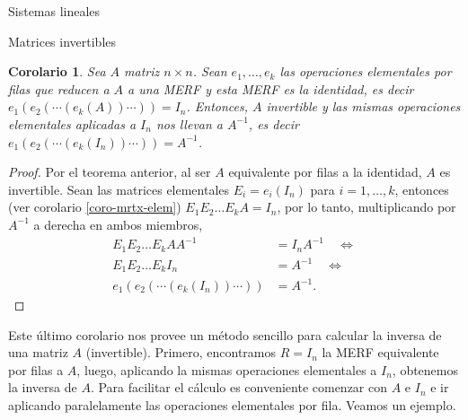 \documentclass[a4paper,12pt,twoside,spanish]{amsbook}
\newtheorem{corolario}[teorema]{Corolario}
\theoremstyle{definition}
\theoremstyle{remark}
\begin{document}
\begin{chapter}{Sistemas lineales}
\begin{section}{Matrices invertibles}
			\begin{corolario}\label{mtrx-inv-gauss}
				Sea $A$ matriz $n \times n$. Sean $e_1,\ldots,e_k$ las operaciones elementales por filas que reducen a $A$  a una MERF y esta MERF es la identidad,  es decir $e_1(e_{2}(\cdots(e_k(A))\cdots)) =I_n$. Entonces, $A$ invertible y  las mismas operaciones elementales aplicadas a $I_n$ nos llevan a $A^{-1}$,  es decir $e_1(e_{2}(\cdots(e_k(I_n))\cdots)) =A^{-1}$.
			\end{corolario}
			\begin{proof} Por el teorema anterior, al ser $A$ equivalente por filas a la identidad, $A$ es invertible.  
				Sean las matrices elementales  $E_i = e_i(I_n)$ para $i=1,\ldots,k$,  entonces (ver corolario \ref{coro-mrtx-elem}) $E_1E_2\ldots E_kA = I_n$, por lo tanto, multiplicando por $A^{-1}$ a derecha en ambos miembros,    
				\begin{align*}
				E_1E_2\ldots E_kA A^{-1}&= I_nA^{-1} \quad \Leftrightarrow \\
				E_1E_2\ldots E_kI_n&= A^{-1} \quad \Leftrightarrow \\
				e_1(e_{2}(\cdots(e_k(I_n))\cdots)) &=A^{-1}.
				\end{align*}
			\end{proof}
			
			Este último corolario nos provee un método sencillo para calcular la inversa de una matriz $A$ (invertible). Primero,  encontramos $R = I_n$ la MERF  equivalente por filas a $A$, luego, aplicando la mismas operaciones elementales a $I_n$, obtenemos la inversa de $A$. Para facilitar el cálculo es  conveniente comenzar con $A$ e $I_n$ e ir aplicando paralelamente las operaciones elementales por fila. Veamos un ejemplo.


\end{section}
\end{chapter}
\end{document}
